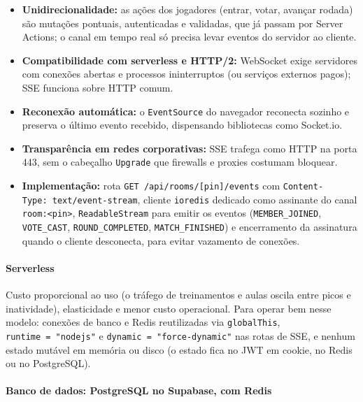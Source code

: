 \documentclass[
  brazilian,
  11pt,
]{article}
\providecommand{\tightlist}{%
  \setlength{\itemsep}{0pt}\setlength{\parskip}{0pt}}
\begin{document}
\begin{itemize}
\tightlist
\item
  \textbf{Unidirecionalidade:} as ações dos jogadores (entrar, votar, avançar rodada) são mutações pontuais, autenticadas e validadas, que já passam por Server Actions; o canal em tempo real só precisa levar eventos do servidor ao cliente.
\item
  \textbf{Compatibilidade com serverless e HTTP/2:} WebSocket exige servidores com conexões abertas e processos ininterruptos (ou serviços externos pagos); SSE funciona sobre HTTP comum.
\item
  \textbf{Reconexão automática:} o \texttt{EventSource} do navegador reconecta sozinho e preserva o último evento recebido, dispensando bibliotecas como Socket.io.
\item
  \textbf{Transparência em redes corporativas:} SSE trafega como HTTP na porta 443, sem o cabeçalho \texttt{Upgrade} que firewalls e proxies costumam bloquear.
\item
  \textbf{Implementação:} rota \texttt{GET\ /api/rooms/{[}pin{]}/events} com \texttt{Content-Type:\ text/event-stream}, cliente \texttt{ioredis} dedicado como assinante do canal \texttt{room:\textless{}pin\textgreater{}}, \texttt{ReadableStream} para emitir os eventos (\texttt{MEMBER\_JOINED}, \texttt{VOTE\_CAST}, \texttt{ROUND\_COMPLETED}, \texttt{MATCH\_FINISHED}) e encerramento da assinatura quando o cliente desconecta, para evitar vazamento de conexões.
\end{itemize}

\paragraph{Serverless}\label{serverless}

Custo proporcional ao uso (o tráfego de treinamentos e aulas oscila entre picos e inatividade), elasticidade e menor custo operacional. Para operar bem nesse modelo: conexões de banco e Redis reutilizadas via \texttt{globalThis}, \texttt{runtime\ =\ "nodejs"} e \texttt{dynamic\ =\ "force-dynamic"} nas rotas de SSE, e nenhum estado mutável em memória ou disco (o estado fica no JWT em cookie, no Redis ou no PostgreSQL).

\paragraph{Banco de dados: PostgreSQL no Supabase, com Redis}\label{banco-de-dados-postgresql-no-supabase-com-redis}
\end{document}
